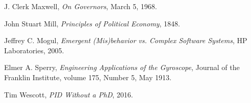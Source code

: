 \begin{thebibliography}{9}
    J. Clerk Maxwell,
    \emph{On Governors},
    March 5, 1968.

    John Stuart Mill,
    \emph{Principles of Political Economy},
    1848.

    Jeffrey C. Mogul,
    \emph{Emergent (Mis)behavior vs. Complex Software Systems},
    HP Laboratories,
    2005.

    Elmer A. Sperry,
    \emph{Engineering Applications of the Gyroscope},
    Journal of the Franklin Institute,
    volume 175,
    Number 5,
    May 1913.

    Tim Wescott,
    \emph{PID Without a PhD},
    2016.

\end{thebibliography}

